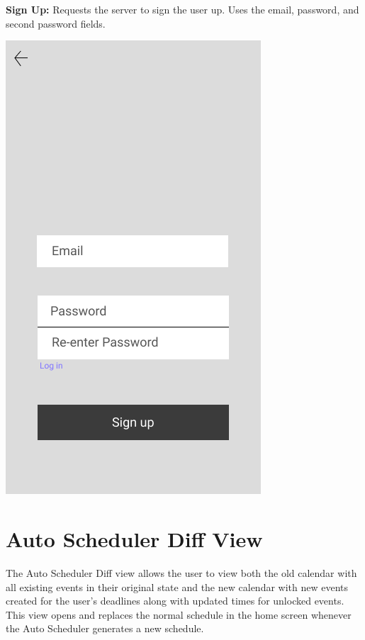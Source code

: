 \documentclass{scrreprt}
\begin{document}
\textbf{Sign Up:}
Requests the server to sign the user up.  Uses the email, password, and second password fields.
\begin{center}
\includegraphics[scale=0.4]{signup.png}
\end{center}

\section{Auto Scheduler Diff View}
The Auto Scheduler Diff view allows the user to view both the old calendar with all existing events in their original state and the new calendar with new events created for the user's deadlines along with updated times for unlocked events.\\
This view opens and replaces the normal schedule in the home screen whenever the Auto Scheduler generates a new schedule.
\end{document}
